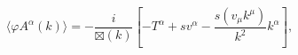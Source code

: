 \begin{equation}
\langle\varphi A^{\alpha}\left(  k\right)  \rangle=-\frac{i}{\boxtimes
(k)}\left[  -T^{\alpha}+sv^{\alpha}-\frac{s\left(  v_{\mu}k^{\mu}\right)
}{k^{2}}k^{\alpha}\right]  , \label{Prop_Aphi}%
\end{equation}%
